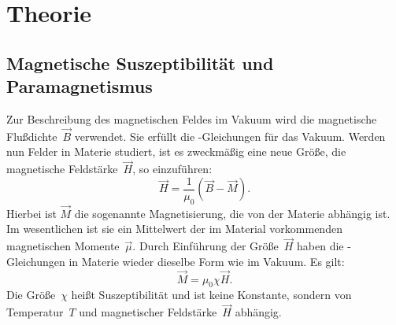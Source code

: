 

\section{Theorie}

\subsection{Magnetische Suszeptibilität und Paramagnetismus}

Zur Beschreibung des magnetischen Feldes im Vakuum wird die magnetische
Flußdichte~$\vec{B}$ verwendet.  Sie erfüllt die
-Gleichungen für das Vakuum.  Werden nun Felder in Materie
studiert, ist es zweckmäßig eine neue Größe, die magnetische
Feldstärke~$\vec{H}$, so einzuführen:
\begin{equation}
  \vec{H} = \frac{1}{\mu_0}(\vec{B} - \vec{M}).
\end{equation}
Hierbei ist $\vec{M}$ die sogenannte Magnetisierung, die von der Materie
abhängig ist.  Im wesentlichen ist sie ein Mittelwert der im Material
vorkommenden magnetischen Momente~$\vec{\mu}$.  Durch Einführung der
Größe~$\vec{H}$ haben die -Gleichungen in Materie wieder
dieselbe Form wie im Vakuum.  Es gilt:
\begin{equation}
  \vec{M} = \mu_0 \chi \vec{H}.
\end{equation}
Die Größe~$\chi$ heißt Suszeptibilität und ist keine Konstante, sondern
von Temperatur~$T$ und magnetischer Feldstärke~$\vec{H}$ abhängig.

